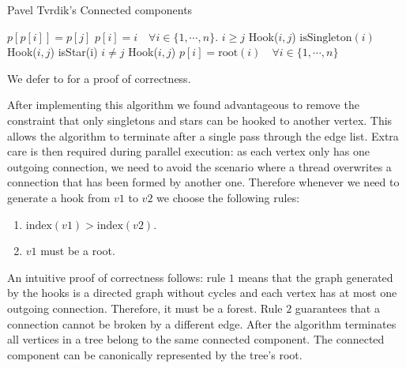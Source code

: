 \begin{algorithm}[H]
    \caption{Pavel Tvrdik's Connected components}
    \label{algorithm:cc1}
    \begin{algorithmic}[1]
          \State $p[p[i]] = p[j]$
        \EndProcedure
          \State $p[i] = i \quad \forall i \in \{1,\cdots, n\}$. 
         
          \State  \kif $i\ge j$ \kthen Hook($i, j$)
          \State  \kif $\text{isSingleton}(i)$ \kthen Hook($i, j$)
        \EndFor
         
          \State  \kif isStar(i) \kand $i \neq j$ \kthen Hook($i, j$)
        \EndFor
        \State $p[i] = \text{root}(i) \quad \forall i \in \{1,\cdots, n\}$ 
        \EndWhile
        \EndProcedure
   \end{algorithmic}
\end{algorithm}
We defer to \cite{PCompClass} for a proof of correctness.

After implementing this algorithm we found advantageous to remove the constraint that only
singletons and stars can be hooked to another vertex. This allows the algorithm to terminate after
a single pass through the edge list. Extra care is then required during parallel execution: as each
vertex
only has one outgoing connection, we need to avoid the scenario where a thread overwrites a
connection that has been formed by another one.
Therefore whenever we need to generate a hook from $v1$ to $v2$ we choose the following rules:

\begin{enumerate}
    \item $\text{index}(v1) > \text{index}(v2)$.
    \item $v1$ must be a root.
\end{enumerate}

An intuitive proof of correctness follows: rule $1$ means that the graph generated
by the hooks is a directed graph without cycles and
 each vertex has at most one outgoing connection. Therefore, it
must be a forest.
Rule $2$ guarantees that a connection cannot be broken by a
different edge.
After the algorithm terminates all vertices in a tree belong to the same connected
component. The connected component can be canonically represented by the tree's root. %

